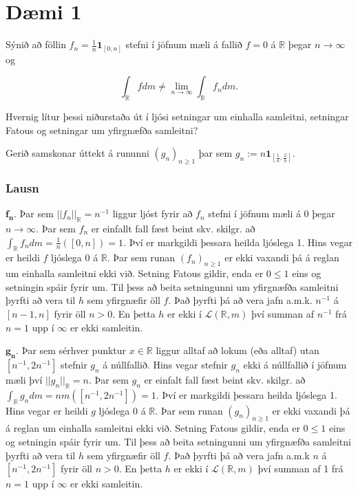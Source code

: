 \documentclass[]{book}
\begin{document}
\hypertarget{dmi-1-5}{%
\section*{Dæmi 1}\label{dmi-1-5}}

Sýnið að föllin \(f_n = \frac1n\mathbf1_{[0,n]}\) stefni í jöfnum mæli á fallið \(f=0\) á \(\mathbb R\) þegar \(n\rightarrow\infty\) og

\[
\int_\mathbb R fdm \neq \lim_{n\rightarrow\infty}\int_\mathbb R f_ndm.
\]

Hvernig lítur þessi niðurstaða út í ljósi setningar um einhalla samleitni, setningar Fatous og setningar um yfirgnæfða samleitni?

Gerið samskonar úttekt á rununni \((g_n)_{n\geq1}\) þar sem \(g_n := n\mathbf1_{[\frac1n,\frac2n]}\).

\hypertarget{lausn}{%
\subsubsection*{Lausn}\label{lausn}}

\(\mathbf{f_n.}\) Þar sem \(||f_n||_{\mathbb R} = n^{-1}\) liggur ljóst fyrir að \(f_n\) stefni í jöfnum mæli á \(0\) þegar \(n\rightarrow\infty\). Þar sem \(f_n\) er einfallt fall fæst beint skv. skilgr. að \(\int_{\mathbb R}f_n dm = \frac1n([0,n])=1\). Því er markgildi þessara heilda ljóslega 1. Hins vegar er heildi \(f\) ljóslega \(0\) á \(\mathbb R\). Þar sem runan \((f_n)_{n\geq1}\) er ekki vaxandi þá á reglan um einhalla samleitni ekki við. Setning Fatous gildir, enda er \(0\leq 1\) eins og setningin spáir fyrir um. Til þess að beita setningunni um yfirgnæfða samleitni þyrfti að vera til \(h\) sem yfirgnæfir öll \(f\). Það þyrfti þá að vera jafn a.m.k. \(n^{-1}\) á \([n-1,n]\) fyrir öll \(n>0\). En þetta \(h\) er ekki í \(\mathcal L(\mathbb R,m)\) því summan af \(n^{-1}\) frá \(n=1\) upp í \(\infty\) er ekki samleitin.

\(\mathbf{g_n.}\) Þar sem sérhver punktur \(x\in\mathbb R\) liggur alltaf að lokum (eða alltaf) utan \([n^{-1},2n^{-1}]\) stefnir \(g_n\) á núllfallið. Hins vegar stefnir \(g_n\) ekki á núllfallið í jöfnum mæli því \(||g_n||_{\mathbb R} = n\). Þar sem \(g_n\) er einfalt fall fæst beint skv. skilgr. að \(\int_{\mathbb R}g_ndm = nm([n^{-1},2n^{-1}]) = 1\). Því er markgildi þessara heilda ljóslega 1. Hins vegar er heildi \(g\) ljóslega \(0\) á \(\mathbb R\). Þar sem runan \((g_n)_{n\geq1}\) er ekki vaxandi þá á reglan um einhalla samleitni ekki við. Setning Fatous gildir, enda er \(0\leq1\) eins og setningin spáir fyrir um. Til þess að beita setningunni um yfirgnæfða samleitni þyrfti að vera til \(h\) sem yfirgnæfir öll \(f\). Það þyrfti þá að vera jafn a.m.k \(n\) á \([n^{-1},2n^{-1}]\) fyrir öll \(n>0\). En þetta \(h\) er ekki í \(\mathcal L(\mathbb R,m)\) því summan af 1 frá \(n=1\) upp í \(\infty\) er ekki samleitin.
\end{document}
